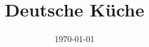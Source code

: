 \documentclass[12pt, a4paper]{article}
\title{Deutsche Küche}
\author{Felsenkatze\and}
\date{\today}
\begin{document}
\onehalfspacing %



\nocite{*}

\blinddocument


\end{document}
